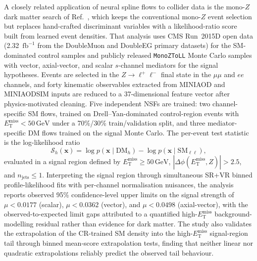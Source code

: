 \documentclass[11pt,a4paper,twocolumn]{article}
\newcommand{\GeV}{\text{GeV}}
\newcommand{\MET}{\ensuremath{E_{\mathrm{T}}^{\mathrm{miss}}}}
\begin{document}
A closely related application of neural spline flows to collider data is the mono-$Z$ dark matter search of Ref.~\cite{Rasineni2026MonoZNSF}, which keeps the conventional mono-$Z$ event selection but replaces hand-crafted discriminant variables with a likelihood-ratio score built from learned event densities. That analysis uses CMS Run~2015D open data (2.32~$\mathrm{fb}^{-1}$ from the DoubleMuon and DoubleEG primary datasets) for the SM-dominated control samples and publicly released \texttt{MonoZToLL} Monte Carlo samples with vector, axial-vector, and scalar $s$-channel mediators for the signal hypotheses. Events are selected in the $Z\to\ell^+\ell^-$ final state in the $\mu\mu$ and $ee$ channels, and forty kinematic observables extracted from MINIAOD and MINIAODSIM inputs are reduced to a 37-dimensional feature vector after physics-motivated cleaning. Five independent NSFs are trained: two channel-specific SM flows, trained on Drell--Yan-dominated control-region events with $\MET<50\,\GeV$ under a 70\%/30\% train/validation split, and three mediator-specific DM flows trained on the signal Monte Carlo. The per-event test statistic is the log-likelihood ratio
\begin{equation*}
\mathcal{S}_h(\mathbf{x}) = \log p(\mathbf{x}\mid\mathrm{DM}_h) - \log p(\mathbf{x}\mid\mathrm{SM}_{\ell\ell}),
\end{equation*}
evaluated in a signal region defined by $\MET\ge 50\,\GeV$, $|\Delta\phi(\MET, Z)| > 2.5$, and $n_{\mathrm{jets}} \le 1$. Interpreting the signal region through simultaneous SR+VR binned profile-likelihood fits with per-channel normalisation nuisances, the analysis reports observed 95\% confidence-level upper limits on the signal strength of $\mu<0.0177$ (scalar), $\mu<0.0362$ (vector), and $\mu<0.0498$ (axial-vector), with the observed-to-expected limit gaps attributed to a quantified high-$\MET$ background-modelling residual rather than evidence for dark matter. The study also validates the extrapolation of the CR-trained SM density into the high-$\MET$ signal-region tail through binned mean-score extrapolation tests, finding that neither linear nor quadratic extrapolations reliably predict the observed tail behaviour.
\end{document}
